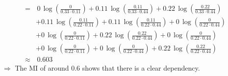 {\begin{align*}
 	= & \,0\, \log\left(\frac{0}{0.33 \cdot 0.11} \right) 
   	+ 0.11\, \log\left(\frac{0.11}{0.33 \cdot 0.44} \right) 
   	+ 0.22\, \log\left(\frac{0.22}{0.33 \cdot 0.44} \right) \\
   	& + 0.11\, \log\left(\frac{0.11}{0.22 \cdot 0.11} \right)
   	+ 0.11\, \log\left(\frac{0.11}{0.22 \cdot 0.44} \right) 
   	+ 0\, \log\left(\frac{0}{0.22 \cdot 0.44} \right) \\
   	& + 0\, \log\left(\frac{0}{0.22 \cdot 0.11} \right)
   	+ 0.22\, \log\left(\frac{0.22}{0.22 \cdot 0.44} \right) 
   	+ 0\, \log\left(\frac{0}{0.22 \cdot 0.44} \right) \\
   	& + 0\, \log\left(\frac{0}{0.22 \cdot 0.11} \right)
   	+ 0\, \log\left(\frac{0}{0.22 \cdot 0.44} \right) 
   	+ 0.22\, \log\left(\frac{0.22}{0.22 \cdot 0.44} \right) \\
   	\approx & \, 0.603
   \end{align*}
$\Rightarrow$
The MI of around 0.6 shows that there is a clear dependency.

}

